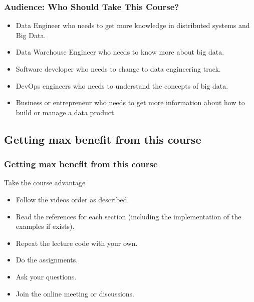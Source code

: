 \begin{frame}
\frametitle{Audience: Who Should Take This Course?}

\begin{itemize}[<+->]
	\item Data Engineer who needs to get more knowledge in distributed systems and Big Data.
	\item Data Warehouse Engineer who needs to know more about big data.
	\item Software developer who needs to change to data engineering track. 
	\item DevOps engineers who needs to understand the concepts of big data.  
	\item Business or entrepreneur who needs to get more information about how to build or manage a data product.
\end{itemize}

\end{frame}

\subsection{Getting max benefit from this course}

\begin{frame}
\frametitle{Getting max benefit from this course}
\begin{block}{Take the course advantage}
	\begin{itemize}[<+->]
		\item Follow the videos order as described.
		\item Read the references for each section (including the implementation of the examples if exists). 
		\item Repeat the lecture code with your own.  
		\item Do the assignments.
		\item Ask your questions. 
		\item Join the online meeting or discussions. 
	\end{itemize}
\end{block}

\end{frame}

